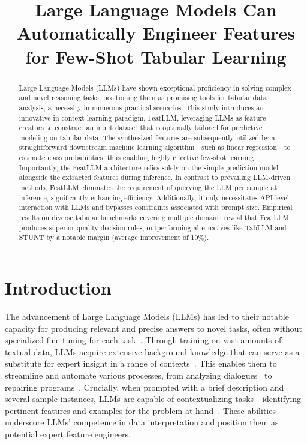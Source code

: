 \title{Large Language Models Can Automatically Engineer Features for Few-Shot Tabular Learning}

\begin{abstract}
Large Language Models (LLMs) have shown exceptional proficiency in solving complex and novel reasoning tasks, positioning them as promising tools for tabular data analysis, a necessity in numerous practical scenarios. This study introduces an innovative in-context learning paradigm, \textsf{FeatLLM}, leveraging LLMs as feature creators to construct an input dataset that is optimally tailored for predictive modeling on tabular data. The synthesized features are subsequently utilized by a straightforward downstream machine learning algorithm—such as linear regression—to estimate class probabilities, thus enabling highly effective few-shot learning. Importantly, the \textsf{FeatLLM} architecture relies solely on the simple prediction model alongside the extracted features during inference. In contrast to prevailing LLM-driven methods, \textsf{FeatLLM} eliminates the requirement of querying the LLM per sample at inference, significantly enhancing efficiency. Additionally, it only necessitates API-level interaction with LLMs and bypasses constraints associated with prompt size. Empirical results on diverse tabular benchmarks covering multiple domains reveal that \textsf{FeatLLM} produces superior quality decision rules, outperforming alternatives like TabLLM and STUNT by a notable margin (average improvement of 10\%).

\end{abstract}

\section{Introduction}
The advancement of Large Language Models (LLMs) has led to their notable capacity for producing relevant and precise answers to novel tasks, often without specialized fine-tuning for each task~\cite{creswell2022selection,imani2023mathprompter,taylor2022galactica}. Through training on vast amounts of textual data, LLMs acquire extensive background knowledge that can serve as a substitute for expert insight in a range of contexts~\cite{Genomes2021,singhal2023large,wilcox2003role}. This enables them to streamline and automate various processes, from analyzing dialogues~\cite{finch2023leveraging} to repairing programs~\cite{fan2023automated}. Crucially, when prompted with a brief description and several sample instances, LLMs are capable of contextualizing tasks—identifying pertinent features and examples for the problem at hand~\cite{brown2020language,zhao2023survey}. These abilities underscore LLMs’ competence in data interpretation and position them as potential expert feature engineers.

